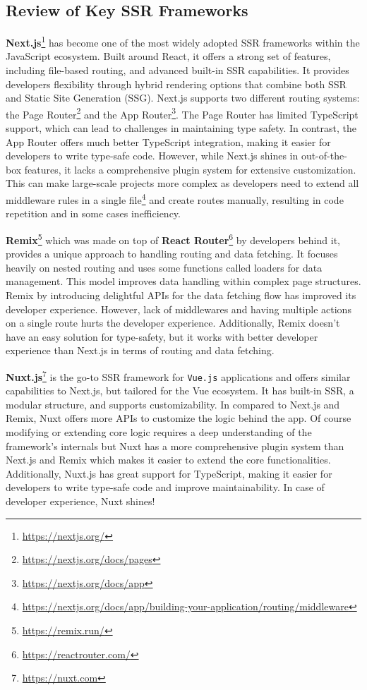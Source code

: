 \subsection{Review of Key SSR Frameworks}

\textbf{Next.js}\footnote{\url{https://nextjs.org/}} has become one of the most widely adopted SSR frameworks within the JavaScript ecosystem. Built around React, it offers a strong set of features, including file-based routing, and advanced built-in SSR capabilities. It provides developers flexibility through hybrid rendering options that combine both SSR and Static Site Generation (SSG). Next.js supports two different routing systems: the Page Router\footnote{\url{https://nextjs.org/docs/pages}} and the App Router\footnote{\url{https://nextjs.org/docs/app}}. The Page Router has limited TypeScript support, which can lead to challenges in maintaining type safety. In contrast, the App Router offers much better TypeScript integration, making it easier for developers to write type-safe code. However, while Next.js shines in out-of-the-box features, it lacks a comprehensive plugin system for extensive customization. This can make large-scale projects more complex as developers need to extend all middleware rules in a single file\footnote{\url{https://nextjs.org/docs/app/building-your-application/routing/middleware}} and create routes manually, resulting in code repetition and in some cases inefficiency.

\textbf{Remix}\footnote{\url{https://remix.run/}} which was made on top of \textbf{React Router}\footnote{\url{https://reactrouter.com/}} by developers behind it, provides a unique approach to handling routing and data fetching. It focuses heavily on nested routing and uses some functions called loaders for data management. This model improves data handling within complex page structures. Remix by introducing delightful APIs for the data fetching flow has improved its developer experience. However, lack of middlewares and having multiple actions on a single route hurts the developer experience. Additionally, Remix doesn't have an easy solution for type-safety, but it works with better developer experience than Next.js in terms of routing and data fetching.


\textbf{Nuxt.js}\footnote{\url{https://nuxt.com}} is the go-to SSR framework for \texttt{Vue.js} applications and offers similar capabilities to Next.js, but tailored for the Vue ecosystem. It has built-in SSR, a modular structure, and supports customizability. In compared to Next.js and Remix, Nuxt offers more APIs to customize the logic behind the app. Of course modifying or extending core logic requires a deep understanding of the framework’s internals but Nuxt has a more comprehensive plugin system than Next.js and Remix which makes it easier to extend the core functionalities. Additionally, Nuxt.js has great support for TypeScript, making it easier for developers to write type-safe code and improve maintainability. In case of developer experience, Nuxt shines!

